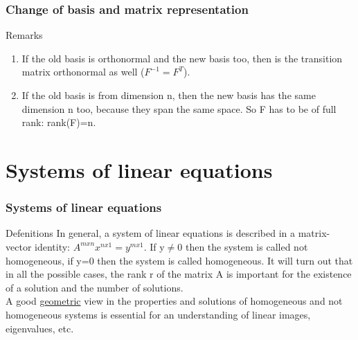 \begin{frame}
	\frametitle{Change of basis and matrix representation}
	\begin{block}{Remarks}
		\begin{enumerate}
			\item If the old basis is orthonormal and the new basis too, then is the transition matrix orthonormal as well ($F^{-1}=F^T$).
			\item If the old basis is from dimension n, then the new basis has the same dimension n too, because they span the same space. So F has to be of full rank: rank(F)=n.
		\end{enumerate}
	\end{block}
\end{frame}

\section{Systems of linear equations}

\begin{frame}
	\frametitle{Systems of linear equations}
	\begin{block}{Defenitions}
		In general, a system of linear equations is described in a matrix-vector identity: $A^{mxn}x^{nx1}=y^{mx1}$. If y$\neq$0 then the system is called not homogeneous, if y=0 then the system is called homogeneous. It will turn out that in all the possible cases, the rank r of the matrix A is important for the existence of a solution and the number of solutions.\\
		A good \underline{geometric} view in the properties and solutions of homogeneous and not homogeneous systems is essential for an understanding of linear images, eigenvalues, etc.
	\end{block}
\end{frame}


